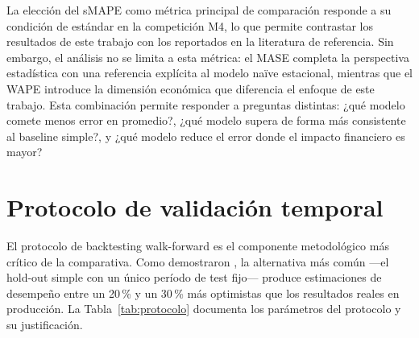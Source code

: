 La elección del sMAPE como métrica principal de comparación responde a su condición de estándar en la competición M4, lo que permite contrastar los resultados de este trabajo con los reportados en la literatura de referencia. Sin embargo, el análisis no se limita a esta métrica: el MASE completa la perspectiva estadística con una referencia explícita al modelo naïve estacional, mientras que el WAPE introduce la dimensión económica que diferencia el enfoque de este trabajo. Esta combinación permite responder a preguntas distintas: ¿qué modelo comete menos error en promedio?, ¿qué modelo supera de forma más consistente al baseline simple?, y ¿qué modelo reduce el error donde el impacto financiero es mayor?

\section{Protocolo de validación temporal}
\label{sec:protocolo_wf}

El protocolo de backtesting walk-forward es el componente metodológico más crítico de la comparativa. Como demostraron \textcite{Bergmeir2012}, la alternativa más común ---el hold-out simple con un único período de test fijo--- produce estimaciones de desempeño entre un 20\,\% y un 30\,\% más optimistas que los resultados reales en producción. La Tabla~\ref{tab:protocolo} documenta los parámetros del protocolo y su justificación.

